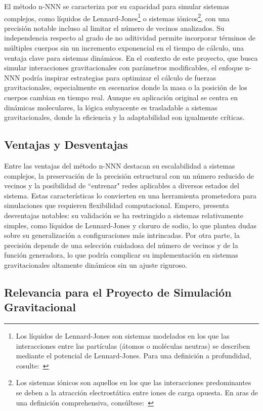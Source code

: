El método n-NNN se caracteriza por su capacidad para simular sistemas complejos, como líquidos de Lennard-Jones\footnote{Los líquidos de Lennard-Jones son sistemas modelados en los que las interacciones entre las partículas (átomos o moléculas neutras) se describen mediante el potencial de Lennard-Jones. Para una definición a profundidad, cosulte:~\cite{Allen2017}} o sistemas iónicos\footnote{Los sistemas iónicos son aquellos en los que las interacciones predominantes se deben a la atracción electrostática entre iones de carga opuesta. En aras de una definición comprehensiva, consúltese:~\cite{Atkins2008}}, con una precisión notable incluso al limitar el número de vecinos analizados. Su independencia respecto al grado de no aditividad permite incorporar términos de múltiples cuerpos sin un incremento exponencial en el tiempo de cálculo, una ventaja clave para sistemas dinámicos. En el contexto de este proyecto, que busca simular interacciones gravitacionales con parámetros modificables, el enfoque n-NNN podría inspirar estrategias para optimizar el cálculo de fuerzas gravitacionales, especialmente en escenarios donde la masa o la posición de los cuerpos cambian en tiempo real. Aunque su aplicación original se centra en dinámicas moleculares, la lógica subyacente es trasladable a sistemas gravitacionales, donde la eficiencia y la adaptabilidad son igualmente críticas.

\subsection{Ventajas y Desventajas}

Entre las ventajas del método n-NNN destacan su escalabilidad a sistemas complejos, la preservación de la precisión estructural con un número reducido de vecinos y la posibilidad de ``entrenar" redes aplicables a diversos estados del sistema. Estas características lo convierten en una herramienta prometedora para simulaciones que requieren flexibilidad computacional. Empero, presenta desventajas notables: su validación se ha restringido a sistemas relativamente simples, como líquidos de Lennard-Jones y cloruro de sodio, lo que plantea dudas sobre su generalización a configuraciones más intrincadas. Por otra parte, la precisión depende de una selección cuidadosa del número de vecinos y de la función generadora, lo que podría complicar su implementación en sistemas gravitacionales altamente dinámicos sin un ajuste riguroso.

\subsection{Relevancia para el Proyecto de Simulación Gravitacional}

